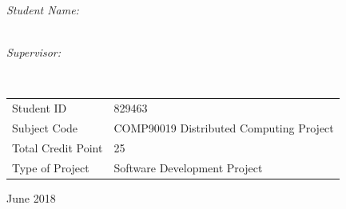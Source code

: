 \documentclass[
11pt, %
oneside, %
english, %
singlespacing, %
headsepline, %
chapterinoneline, %
consistentlayout, %
]{MastersDoctoralThesis} %
\begin{document}
\begin{titlepage}
\begin{center}
\begin{minipage}[t]{0.4\textwidth}
\begin{flushleft} \large
\emph{Student Name:}\\
\href{http://sankholin.com}{\authorname}\\
\end{flushleft}
\end{minipage}
\begin{minipage}[t]{0.4\textwidth}
\begin{flushright} \large
\emph{Supervisor:} \\
\href{https://cis.unimelb.edu.au/people/staff.php?person_ID=342078}{\supname} %
\end{flushright}
\end{minipage}\\[3cm]
 
\vfill


\begin{table}[H]
\centering
\begin{small}
    \begin{tabular}{ | l | p{7cm} |}
    \hline
    Student ID & 829463 \\
    Subject Code & COMP90019 Distributed Computing Project \\    
    Total Credit Point & 25 \\
    Type of Project & Software Development Project \\
    \hline
    \end{tabular}
\end{small}
\end{table}

June 2018\\[0.4cm]


\HRule \\
\groupname\\\deptname\\\facname\\[2cm] %
 
\vfill

 
\vfill
\end{center}
\end{titlepage}
\end{document}
